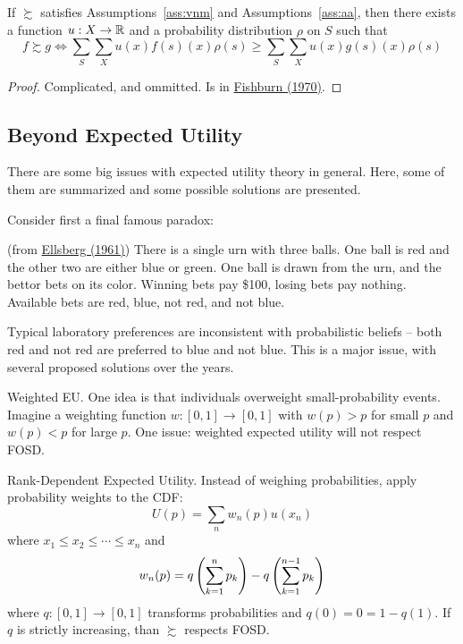 \documentclass[12pt]{article}
\begin{document}
\begin{theorem}
	If $\succsim$ satisfies Assumptions~\ref{ass:vnm} and Assumptions~\ref{ass:aa}, then there exists a function $u: X \to \mathbb{R}$ and a probability distribution $\rho$ on $S$ such that
	\[
	f \succsim g \Longleftrightarrow \sum_S \sum_X u(x) f(s)(x) \rho(s) \ge \sum_S \sum_X u(x) g(s)(x) \rho(s)
	\]
\end{theorem}
\begin{proof}
	Complicated, and ommitted. Is in \href{https://www.semanticscholar.org/paper/Utility-theory-for-decision-making-Fishburn/905a24a912171436e0abd3b5f1fdcb963e6f852f}{Fishburn (1970)}.
\end{proof}

\subsection{Beyond Expected Utility}

\begin{remark}
	There are some big issues with expected utility theory in general. Here, some of them are summarized and some possible solutions are presented.
\end{remark}

Consider first a final famous paradox:

\begin{example}
	 (from \href{https://www.jstor.org/stable/1884324}{Ellsberg (1961)}) There is a single urn with three balls. One ball is red and the other two are either blue or green. One ball is drawn from the urn, and the bettor bets on its color. Winning bets pay \$100, losing bets pay nothing. Available bets are red, blue, not red, and not blue. 
	
	Typical laboratory preferences are inconsistent with probabilistic beliefs -- both red and not red are preferred to blue and not blue. This is a major issue, with several proposed solutions over the years.
\end{example}

\begin{example}
	Weighted EU. One idea is that individuals overweight small-probability events. Imagine a weighting function $w: [0,1] \to [0,1]$ with $w(p) > p$ for small $p$ and $w(p) < p$ for large $p$. One issue: weighted expected utility will not respect FOSD. 
\end{example}

\begin{example}
	Rank-Dependent Expected Utility. Instead of weighing probabilities, apply probability weights to the CDF:
	\[
	U(p) = \sum_n w_n(p)u(x_n)
	\]
	where $x_1 \le x_2 \le \cdots \le x_n$ and 
	\[
	w_n(p) = q\left( \sum_{k=1}^n p_k\right) - q\left( \sum_{k=1}^{n-1}p_k\right)
	\]
	where $q: [0,1] \to [0,1]$ transforms probabilities and $q(0) = 0 = 1-q(1)$. If $q$ is strictly increasing, than $\succsim$ respects FOSD.
\end{example}
\end{document}
